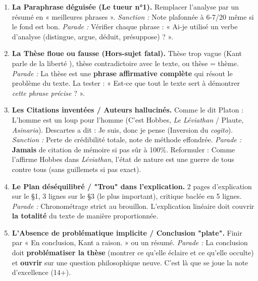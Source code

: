 \documentclass[11pt]{article}
\newcommand{\cle}[1]{{\popxbold\color{popdark}#1}}
\begin{document}
\begin{attention}
    \begin{enumerate}
        \item \textbf{La \cle{Paraphrase déguisée} (Le tueur n°1).} Remplacer l'analyse par un résumé en « meilleures phrases ». \textit{Sanction :} Note plafonnée à 6-7/20 même si le fond est bon. \textit{Parade :} Vérifier chaque phrase : « Ai-je utilisé un verbe d'analyse (distingue, argue, déduit, présuppose) ? ».
        \item \textbf{La \cle{Thèse floue ou fausse} (Hors-sujet fatal).} Thèse trop vague (\guillemotleft Kant parle de la liberté \guillemotright), thèse contradictoire avec le texte, ou thèse = thème. \textit{Parade :} La thèse est une \textbf{phrase affirmative complète} qui résout le problème du texte. La tester : « Est-ce que tout le texte sert à démontrer \emph{cette phrase précise} ? ».
        \item \textbf{Les \cle{Citations inventées / Auteurs hallucinés}.} \guillemotleft Comme le dit Platon : \guillemotleft L'homme est un loup pour l'homme \guillemotright \guillemotright (C'est Hobbes, \emph{Le Léviathan} / Plaute, \emph{Asinaria}). \guillemotleft Descartes a dit : \guillemotleft Je suis, donc je pense \guillemotright \guillemotright (Inversion du \emph{cogito}). \textit{Sanction :} Perte de crédibilité totale, note de méthode effondrée. \textit{Parade :} \textbf{Jamais} de citation de mémoire si pas sûr à 100\%. Reformuler : \guillemotleft Comme l'affirme Hobbes dans \emph{Léviathan}, l'état de nature est une guerre de tous contre tous \guillemotright (sans guillemets si pas exact).
        \item \textbf{Le \cle{Plan déséquilibré / "Trou" dans l'explication}.} 2 pages d'explication sur le §1, 3 lignes sur le §3 (le plus important), critique baclée en 5 lignes. \textit{Parade :} Chronométrage strict au brouillon. L'explication linéaire doit couvrir \textbf{la totalité} du texte de manière proportionnée.
        \item \textbf{L'\cle{Absence de problématique implicite / Conclusion "plate"}.} Finir par « En conclusion, Kant a raison. » ou un résumé. \textit{Parade :} La conclusion doit \textbf{problématiser la thèse} (montrer ce qu'elle éclaire et ce qu'elle occulte) et \textbf{ouvrir} sur une question philosophique neuve. C'est là que se joue la note d'excellence (14+).
    \end{enumerate}
\end{attention}
\end{document}
